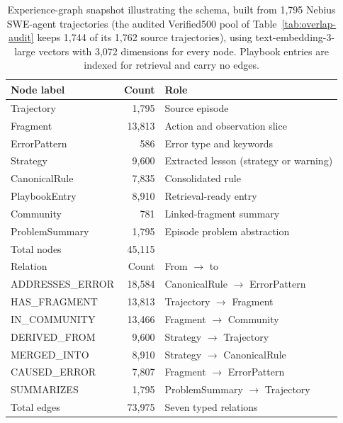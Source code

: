 \begin{table}[htbp]
\centering
\caption{Experience-graph snapshot illustrating the schema, built from 1,795
Nebius SWE-agent trajectories (the audited Verified500 pool of
Table~\ref{tab:overlap-audit} keeps 1,744 of its 1,762 source trajectories),
using text-embedding-3-large
vectors with 3,072 dimensions for every node. Playbook entries are indexed for
retrieval and carry no edges.}
\label{tab:schema}
\begin{tabular}{lrl}
\toprule
Node label & Count & Role \\
\midrule
Trajectory & 1,795 & Source episode \\
Fragment & 13,813 & Action and observation slice \\
ErrorPattern & 586 & Error type and keywords \\
Strategy & 9,600 & Extracted lesson (strategy or warning) \\
CanonicalRule & 7,835 & Consolidated rule \\
PlaybookEntry & 8,910 & Retrieval-ready entry \\
Community & 781 & Linked-fragment summary \\
ProblemSummary & 1,795 & Episode problem abstraction \\
\midrule
Total nodes & 45,115 & \\
\midrule
Relation & Count & From $\rightarrow$ to \\
\midrule
ADDRESSES\_ERROR & 18,584 & CanonicalRule $\rightarrow$ ErrorPattern \\
HAS\_FRAGMENT & 13,813 & Trajectory $\rightarrow$ Fragment \\
IN\_COMMUNITY & 13,466 & Fragment $\rightarrow$ Community \\
DERIVED\_FROM & 9,600 & Strategy $\rightarrow$ Trajectory \\
MERGED\_INTO & 8,910 & Strategy $\rightarrow$ CanonicalRule \\
CAUSED\_ERROR & 7,807 & Fragment $\rightarrow$ ErrorPattern \\
SUMMARIZES & 1,795 & ProblemSummary $\rightarrow$ Trajectory \\
\midrule
Total edges & 73,975 & Seven typed relations \\
\bottomrule
\end{tabular}
\end{table}
